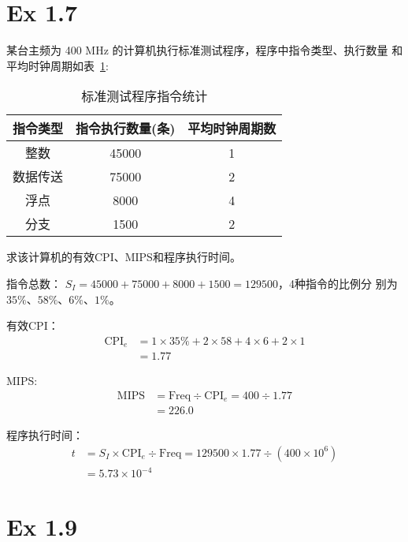 \newcommand{\doctitle}{计算机系统结构第一次作业}


\section{Ex 1.7}

某台主频为 400 MHz 的计算机执行标准测试程序，程序中指令类型、执行数量
和平均时钟周期如表~\ref{tab:1-7}:

\begin{table}[!h]
  \caption{标准测试程序指令统计}
  \label{tab:1-7}
  \centering
  \begin{tabular}{ccc}
    \toprule
    指令类型 & 指令执行数量(条) & 平均时钟周期数 \\
    \midrule
    整数 & 45000 & 1 \\
    数据传送 & 75000 & 2 \\
    浮点 & 8000 & 4\\
    分支 & 1500 & 2\\\bottomrule
  \end{tabular}
\end{table}

求该计算机的有效CPI、MIPS和程序执行时间。

\begin{solve}
指令总数： $S_I = 45000 + 75000 + 8000 + 1500 = 129500$，4种指令的比例分
别为 $35\%$、$58\%$、$6\%$、$1\%$。

有效CPI：
\begin{align*}
  \mathrm{CPI}_e &= 1\times{}35\% + 2\times{}58 + 4\times{}6 +
  2\times{}1\\
  &= 1.77
\end{align*}

MIPS:
\begin{align*}
  \mathrm{MIPS} &= \mathrm{Freq} \div \mathrm{CPI}_e = 400 \div
  1.77 \\
  &= 226.0
\end{align*}

程序执行时间：
\begin{align*}
  t &= S_I \times{} \mathrm{CPI}_e \div \mathrm{Freq} =
  129500 \times 1.77 \div (400\times{}10^6)\\
  &= 5.73 \times 10^{-4}
\end{align*}
\end{solve}

\section{Ex 1.9}

